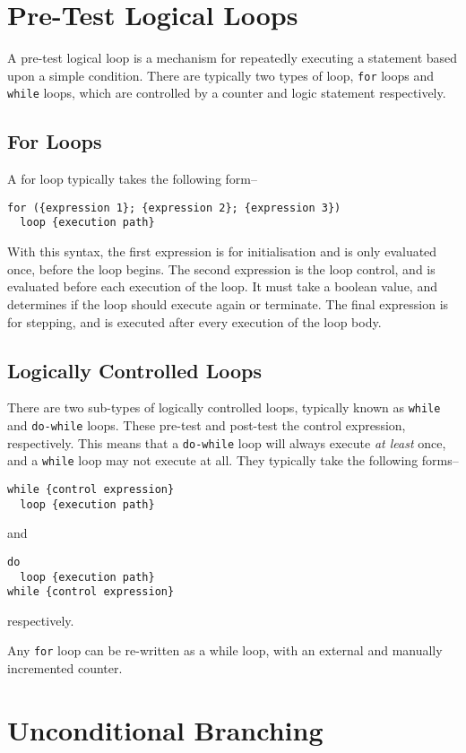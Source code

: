 \section*{Pre-Test Logical Loops}

A pre-test logical loop is a mechanism for repeatedly executing a statement based upon a simple condition. There are
 typically two types of loop, \verb`for` loops and \verb`while` loops, which are controlled by a counter and logic
 statement respectively.

\subsection*{For Loops}

A for loop typically takes the following form--
\begin{verbatim}
for ({expression 1}; {expression 2}; {expression 3})
  loop {execution path}
\end{verbatim}
With this syntax, the first expression is for initialisation and is only evaluated once, before the loop begins. The
 second expression is the loop control, and is evaluated before each execution of the loop. It must take a boolean value,
 and determines if the loop should execute again or terminate. The final expression is for stepping, and is executed
 after every execution of the loop body.

\subsection*{Logically Controlled Loops}

There are two sub-types of logically controlled loops, typically known as \verb`while` and \verb`do-while` loops. These
 pre-test and post-test the control expression, respectively. This means that a \verb`do-while` loop will always execute
 \textit{at least} once, and a \verb`while` loop may not execute at all. They typically take the following forms--
\begin{verbatim}
while {control expression}
  loop {execution path}
\end{verbatim}
and
\begin{verbatim}
do
  loop {execution path}
while {control expression}
\end{verbatim}
respectively.

Any \verb`for` loop can be re-written as a while loop, with an external and manually incremented counter.

\section*{Unconditional Branching}

